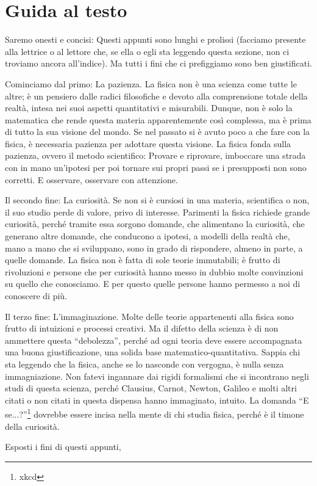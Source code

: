 \chapter*{Guida al testo}
Saremo onesti e concisi: Questi appunti sono lunghi e prolissi (facciamo presente
alla lettrice o al lettore che, se ella o egli sta leggendo questa sezione,
non ci troviamo ancora all'indice). Ma tutti i fini che ci prefiggiamo sono ben
giustificati.

Cominciamo dal primo: La pazienza. La fisica non è una scienza come tutte le altre;
è un pensiero dalle radici filosofiche e devoto alla comprensione totale della
realtà, intesa nei suoi aspetti quantitativi e misurabili. Dunque, non è solo la
matematica che rende questa materia apparentemente così complessa, ma è prima di
tutto la sua visione del mondo. Se nel passato si è avuto poco a che fare con la
fisica, è necessaria pazienza per adottare questa visione. La fisica fonda sulla
pazienza, ovvero il metodo scientifico: Provare e riprovare, imboccare una strada
con in mano un'ipotesi per poi tornare sui propri passi se i presupposti non sono
corretti. E osservare, osservare con attenzione.

Il secondo fine: La curiosità. Se non si è cursiosi in una materia, scientifica o
non, il suo studio perde di valore, privo di interesse. Parimenti la fisica richiede
grande curiosità, perché tramite essa sorgono domande, che alimentano la curiosità,
che generano altre domande, che conducono a ipotesi, a modelli della realtà che,
mano a mano che si sviluppano, sono in grado di rispondere, almeno in parte, a
quelle domande. La fisica non è fatta di sole teorie immutabili; è frutto di rivoluzioni
e persone che per curiosità hanno messo in dubbio molte convinzioni su quello
che conosciamo. E per questo quelle persone hanno permesso a noi di conoscere di più.

Il terzo fine: L'immaginazione. Molte delle teorie appartenenti alla fisica
sono frutto di intuizioni e processi creativi. Ma il difetto della scienza è
di non ammettere questa ``debolezza'', perché ad ogni teoria deve essere
accompagnata una buona giustificazione, una solida base matematico-quantitativa.
Sappia chi sta leggendo che la fisica, anche se lo nasconde con vergogna, è
nulla senza immagniazione. Non fatevi ingannare dai rigidi formalismi che si
incontrano negli studi di questa scienza, perché Clausius, Carnot, Newton,
Galileo e molti altri citati o non citati in questa dispensa hanno immaginato,
intuito. La domanda ``E se...?''\footnote{xkcd} dovrebbe essere incisa nella mente
di chi studia fisica, perché è il timone della curiosità.

Esposti i fini di questi appunti, 